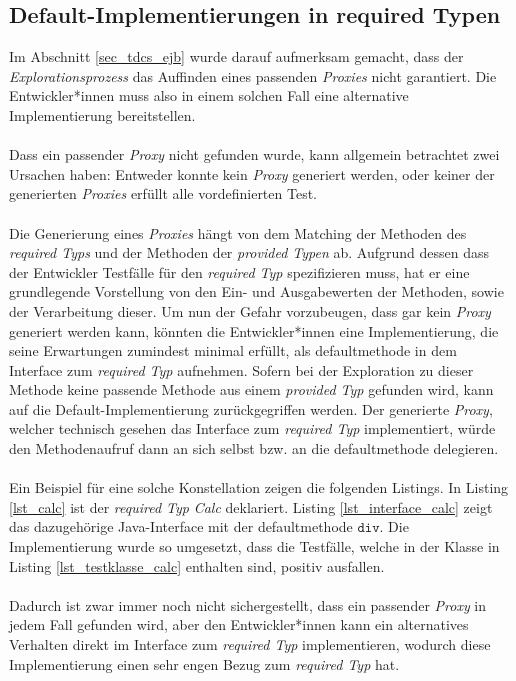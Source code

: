 \subsection{Default-Implementierungen in required Typen}
Im Abschnitt \ref{sec_tdcs_ejb} wurde darauf aufmerksam gemacht, dass der \emph{Explorationsprozess} das Auffinden eines passenden \emph{Proxies} nicht garantiert. Die Entwickler*innen muss also in einem solchen Fall eine alternative Implementierung bereitstellen.
\\\\
Dass ein passender \emph{Proxy} nicht gefunden wurde, kann allgemein betrachtet zwei Ursachen haben: Entweder konnte kein \emph{Proxy} generiert werden, oder keiner der generierten \emph{Proxies} erfüllt alle vordefinierten Test. 
\\\\
Die Generierung eines \emph{Proxies} hängt von dem Matching der Methoden des \emph{required Typs} und der Methoden der \emph{provided Typen} ab. Aufgrund dessen dass der Entwickler Testfälle für den \emph{required Typ} spezifizieren muss, hat er eine grundlegende Vorstellung von den Ein- und Ausgabewerten der Methoden, sowie der Verarbeitung dieser. Um nun der Gefahr vorzubeugen, dass gar kein \emph{Proxy} generiert werden kann, könnten die Entwickler*innen eine Implementierung, die seine Erwartungen zumindest minimal erfüllt, als \Gls{defaultmethode} in dem \Gls{Interface} zum \emph{required Typ} aufnehmen. Sofern bei der Exploration zu dieser Methode keine passende Methode aus einem \emph{provided Typ} gefunden wird, kann auf die Default-Implementierung zurückgegriffen werden. Der generierte \emph{Proxy}, welcher technisch gesehen das \Gls{Interface} zum \emph{required Typ} implementiert, würde den Methodenaufruf dann an sich selbst bzw. an die \Gls{defaultmethode} delegieren.
\\\\
Ein Beispiel für eine solche Konstellation zeigen die folgenden Listings. In Listing \ref{lst_calc} ist der \emph{required Typ} \emph{Calc} deklariert. Listing \ref{lst_interface_calc} zeigt das dazugehörige Java-Interface mit der \Gls{defaultmethode} $\texttt{div}$. Die Implementierung wurde so umgesetzt, dass die Testfälle, welche in der Klasse in Listing \ref{lst_testklasse_calc} enthalten sind, positiv ausfallen.
\\\\
Dadurch ist zwar immer noch nicht sichergestellt, dass ein passender \emph{Proxy} in jedem Fall gefunden wird, aber den Entwickler*innen kann ein alternatives Verhalten direkt im \Gls{Interface} zum \emph{required Typ} implementieren, wodurch diese Implementierung einen sehr engen Bezug zum \emph{required Typ} hat.
